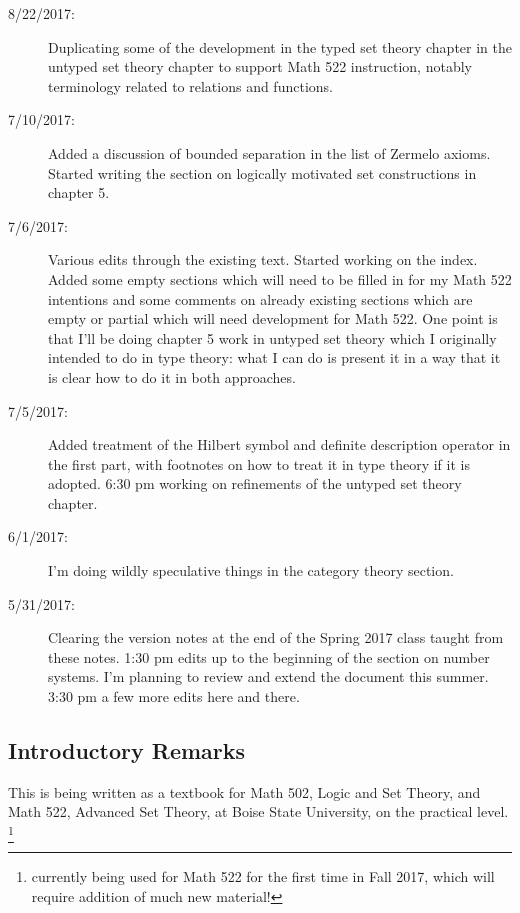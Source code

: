 \documentclass[12pt]{book}
\begin{document}
{\begin{description}
\item[8/22/2017:]  Duplicating some of the development in the typed set theory chapter in the untyped set theory chapter to support Math 522 instruction, notably terminology related to relations and functions.

\item[7/10/2017:]  Added a discussion of bounded separation in the list of Zermelo axioms.  Started writing the section on logically motivated set constructions in chapter 5.

\item[7/6/2017:]  Various edits through the existing text.  Started working on the index.  Added some empty sections which will need to be filled in for my Math 522 intentions and some comments on already existing sections which are empty or partial which will need development for Math 522.  One point is that I'll be doing chapter 5 work in untyped set theory which I originally intended to do in type theory:  what I can do is present it in a way that it is clear how to do it in both approaches.

\item[7/5/2017:]  Added treatment of the Hilbert symbol and definite description operator in the first part, with footnotes on how to treat it in type theory if it is adopted.  6:30 pm working on refinements of the untyped set theory chapter.

\item[6/1/2017:]  I'm doing wildly speculative things in the category theory section.

\item[5/31/2017:]  Clearing the version notes at the end of the Spring 2017 class taught from these notes.  1:30 pm edits up to the beginning of the section on number systems.  I'm planning to review and extend the document this summer.  3:30 pm a few more edits here and there.

\end{description}}

\newpage

\subsection{Introductory Remarks}

This is being written as a textbook for Math 502, Logic and Set Theory, and Math 522, Advanced Set Theory,
at Boise State University, on the practical level.  \footnote{currently being used for Math 522 for the first time in Fall 2017, which will require addition of much new material!}
\end{document}
